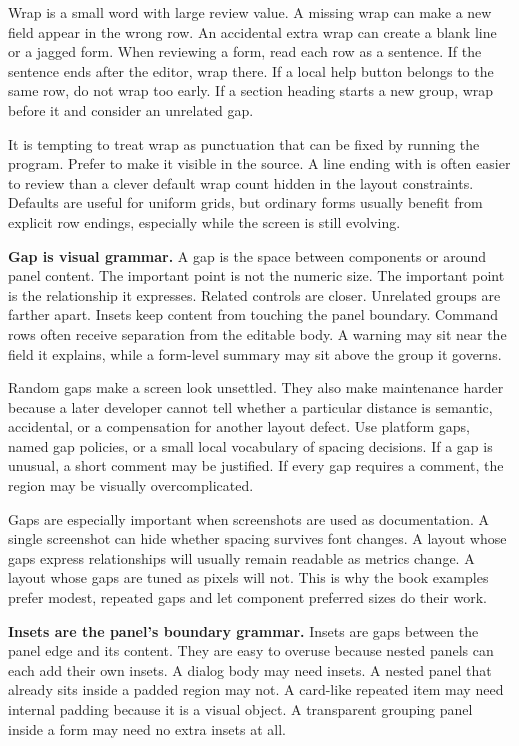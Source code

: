 Wrap is a small word with large review value. A missing wrap can make a new
field appear in the wrong row. An accidental extra wrap can create a blank
line or a jagged form. When reviewing a form, read each row as a sentence. If
the sentence ends after the editor, wrap there. If a local help button belongs
to the same row, do not wrap too early. If a section heading starts a new
group, wrap before it and consider an unrelated gap.

It is tempting to treat wrap as punctuation that can be fixed by running the
program. Prefer to make it visible in the source. A line ending with
 is often easier to review than a clever default wrap count hidden
in the layout constraints. Defaults are useful for uniform grids, but ordinary
forms usually benefit from explicit row endings, especially while the screen is
still evolving.

\textbf{Gap is visual grammar.} A gap is the space between components or around
panel content. The important point is not the numeric size. The important point
is the relationship it expresses. Related controls are closer. Unrelated groups
are farther apart. Insets keep content from touching the panel boundary.
Command rows often receive separation from the editable body. A warning may sit
near the field it explains, while a form-level summary may sit above the group
it governs.

Random gaps make a screen look unsettled. They also make maintenance harder
because a later developer cannot tell whether a particular distance is
semantic, accidental, or a compensation for another layout defect. Use
platform gaps, named gap policies, or a small local vocabulary of spacing
decisions. If a gap is unusual, a short comment may be justified. If every gap
requires a comment, the region may be visually overcomplicated.

Gaps are especially important when screenshots are used as documentation. A
single screenshot can hide whether spacing survives font changes. A layout
whose gaps express relationships will usually remain readable as metrics
change. A layout whose gaps are tuned as pixels will not. This is why the book
examples prefer modest, repeated gaps and let component preferred sizes do
their work.

\textbf{Insets are the panel's boundary grammar.} Insets are gaps between the
panel edge and its content. They are easy to overuse because nested panels can
each add their own insets. A dialog body may need insets. A nested panel that
already sits inside a padded region may not. A card-like repeated item may need
internal padding because it is a visual object. A transparent grouping panel
inside a form may need no extra insets at all.

